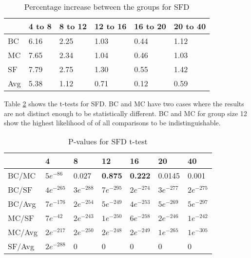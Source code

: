 \begin{table}[H]
	\centering
	\begin{tabular}{|l|lllll|}\hline
		& 4 to 8 & 8 to 12 & 12 to 16 & 16 to 20 & 20 to 40 \\ \hline
		BC 	& 6.16	& 2.25	& 1.03	& 0.44	& 1.12 \\
		MC  & 7.65	& 2.34	& 1.04	& 0.46	& 1.03 \\
		SF  & 7.79	& 2.75	& 1.30	& 0.55	& 1.42 \\
		Avg	& 5.38	& 1.12	& 0.71	& 0.12	& 0.59 \\ \hline
	\end{tabular}
	\caption{Percentage increase between the groups for SFD}
	\label{tbl:sfd}
\end{table}

Table \ref{tbl:sfd_ttest} shows the t-tests for SFD. BC and MC have two cases where the results are not distinct enough to be statistically different. BC and MC for group size 12 show the highest likelihood of of all comparisons to be indistinguishable.

\begin{table}[H]
	\centering
	\begin{tabular}{|l|llllll|}\hline
		& 4 & 8 & 12 & 16 & 20 & 40 \\\hline
		BC/MC	& $5e^{-86}$	& 0.027	& \textbf{0.875}	& \textbf{0.222}	& 0.0145 & 0.001 \\
		BC/SF	& $4e^{-265}$	& $3e^{-288}$	& $7e^{-295}$	& $2e^{-274}$	& $3e^{-277}$ & $2e^{-275}$ \\
		BC/Avg	& $7e^{-176}$	& $2e^{-254}$	& $5e^{-249}$	& $4e^{-253}$	& $5e^{-269}$ & $5e^{-297}$ \\
		MC/SF	& $7e^{-42}$	& $2e^{-243}$ 	& $1e^{-250}$	& $6e^{-258}$	& $2e^{-246}$ & $1e^{-242}$ \\
		MC/Avg	& $2e^{-217}$	& $2e^{-250}$ 	& $2e^{-248}$	& $2e^{-249}$	& $1e^{-265}$ & $1e^{-305}$ \\
		SF/Avg	& $2e^{-288}$	& 0	& 0	& 0	& 0 & 0 \\ \hline
	\end{tabular}
	\caption{P-values for SFD t-test}
	\label{tbl:sfd_ttest}
\end{table}